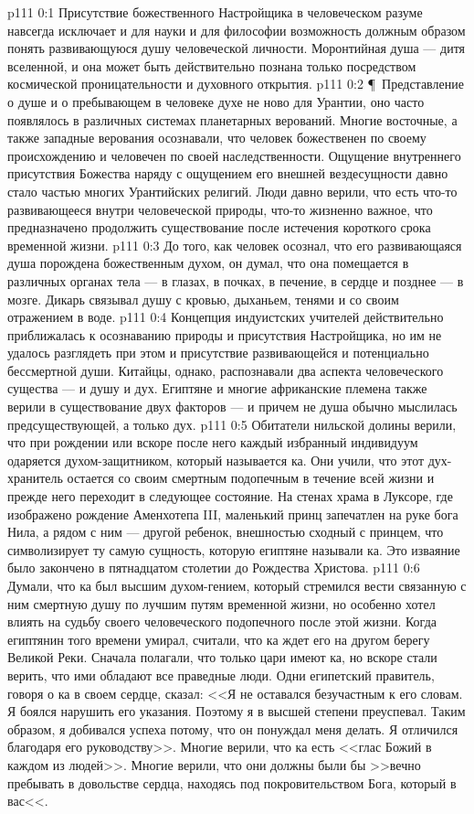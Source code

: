 \vs p111 0:1 Присутствие божественного Настройщика в человеческом разуме навсегда исключает и для науки и для философии возможность должным образом понять развивающуюся душу человеческой личности. Моронтийная душа --- дитя вселенной, и она может быть действительно познана только посредством космической проницательности и духовного открытия.
\vs p111 0:2 \P\ Представление о душе и о пребывающем в человеке духе не ново для Урантии, оно часто появлялось в различных системах планетарных верований. Многие восточные, а также западные верования осознавали, что человек божественен по своему происхождению и человечен по своей наследственности. Ощущение внутреннего присутствия Божества наряду с ощущением его внешней вездесущности давно стало частью многих Урантийских религий. Люди давно верили, что есть что\hyp{}то развивающееся внутри человеческой природы, что\hyp{}то жизненно важное, что предназначено продолжить существование после истечения короткого срока временной жизни.
\vs p111 0:3 До того, как человек осознал, что его развивающаяся душа порождена божественным духом, он думал, что она помещается в различных органах тела --- в глазах, в почках, в печение, в сердце и позднее --- в мозге. Дикарь связывал душу с кровью, дыханьем, тенями и со своим отражением в воде.
\vs p111 0:4 Концепция  индуистских учителей действительно приближалась к осознаванию природы и присутствия Настройщика, но им не удалось разглядеть при этом и присутствие развивающейся и потенциально бессмертной души. Китайцы, однако, распознавали два аспекта человеческого существа ---  и  душу и дух. Египтяне и многие африканские племена также верили в существование двух факторов ---  и  причем не душа обычно мыслилась предсуществующей, а только дух.
\vs p111 0:5 Обитатели нильской долины верили, что при рождении или вскоре после него каждый избранный индивидуум одаряется духом\hyp{}защитником, который называется ка. Они учили, что этот дух\hyp{}хранитель остается со своим смертным подопечным в течение всей жизни и прежде него переходит в следующее состояние. На стенах храма в Луксоре, где изображено рождение Аменхотепа III, маленький принц запечатлен на руке бога Нила, а рядом с ним --- другой ребенок, внешностью сходный с принцем, что символизирует ту самую сущность, которую египтяне называли ка. Это изваяние было закончено в пятнадцатом столетии до Рождества Христова.
\vs p111 0:6 Думали, что ка был высшим духом\hyp{}гением, который стремился вести связанную с ним смертную душу по лучшим путям временной жизни, но особенно хотел влиять на судьбу своего человеческого подопечного после этой жизни. Когда египтянин того времени умирал, считали, что ка ждет его на другом берегу Великой Реки. Сначала полагали, что только цари имеют ка, но вскоре стали верить, что ими обладают все праведные люди. Одни египетский правитель, говоря о ка в своем сердце, сказал: <<Я не оставался безучастным к его словам. Я боялся нарушить его указания. Поэтому я в высшей степени преуспевал. Таким образом, я добивался успеха потому, что он понуждал меня делать. Я отличился благодаря его руководству>>. Многие верили, что ка есть <<глас Божий в каждом из людей>>. Многие верили, что они должны были бы >>вечно пребывать в довольстве сердца, находясь под покровительством Бога, который в вас<<.
